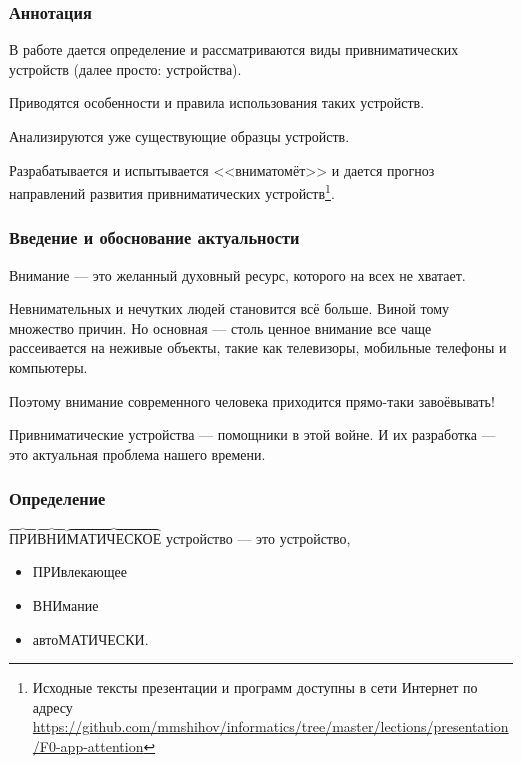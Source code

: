 \begin{frame}
    \frametitle{Аннотация}
    
    В работе дается определение и рассматриваются виды \alert{привниматических устройств} (далее просто: \alert{устройства}).
    
    \par\bigskip
    
    Приводятся \alert{особенности и правила} использования таких устройств. 
    
    \par\bigskip

    Анализируются уже \alert{существующие образцы} устройств.

    \par\bigskip
    
    Разрабатывается и испытывается <<вниматомёт>> \alert{\myDevice} и дается прогноз направлений развития привниматических устройств\footnote{Исходные тексты презентации и программ доступны в сети Интернет по адресу \url{https://github.com/mmshihov/informatics/tree/master/lections/presentation/F0-app-attention}}.
\end{frame}

\begin{frame}
    \frametitle{Введение и обоснование актуальности}
    
    \alert{Внимание} --- это желанный духовный ресурс, которого на всех не хватает. 

    \par\bigskip
    Невнимательных и нечутких людей становится всё больше. Виной тому множество причин. Но основная --- столь ценное внимание все чаще рассеивается на \alert{неживые} объекты, такие как телевизоры, мобильные телефоны и компьютеры.

    \par\bigskip

    Поэтому внимание современного человека приходится прямо-таки \alert{завоёвывать}!

    \par\bigskip

    Привниматические устройства --- помощники в этой войне. И их разработка --- это актуальная проблема нашего времени.
\end{frame}

\begin{frame}
    \frametitle{Определение}
    
    \begin{block}{}
        \par\bigskip
        \alert{$\overbrace{\text{ПРИ}}\overbrace{\text{ВНИ}}\overbrace{\text{МАТИЧЕСКОЕ}}$} устройство --- это устройство, 
        \begin{itemize}
            \item \alert{ПРИ}влекающее 
            \item \alert{ВНИ}мание 
            \item авто\alert{МАТИЧЕСКИ}.
        \end{itemize}
    \end{block}
\end{frame}
    
